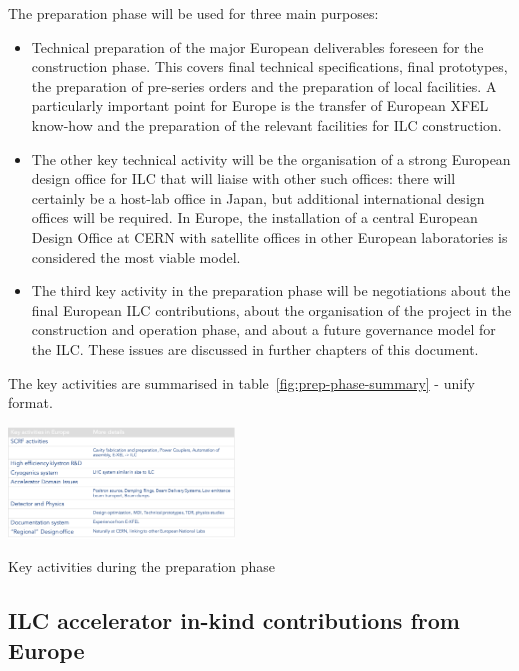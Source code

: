 \documentclass[%
 reprint,
 amsmath,amssymb,
 aps,
]{revtex4-1}
\begin{document}
The preparation phase will be used for three main purposes:

\begin{itemize}
\item 
Technical preparation of the major European deliverables foreseen for the construction phase. This covers final technical specifications, final prototypes, the preparation of pre-series orders and the preparation of local facilities. A particularly important point for Europe is the transfer of European XFEL know-how and the preparation of the relevant facilities for ILC construction.
\item
The other key technical activity will be the organisation of a strong European design office for ILC that will liaise with other such offices: there will certainly be a host-lab office in Japan, but additional international design offices will be required. In Europe, the installation of a central European Design Office at CERN with satellite offices in other European laboratories is considered the most viable model.
\item 
The third key activity in the preparation phase will be negotiations about the final European ILC contributions, about the organisation of the project in the construction and operation phase, and about a future governance model for the ILC. These issues are discussed in further chapters of this document.
\end{itemize}

The key activities are summarised in table~\ref{fig:prep-phase-summary} - unify format.


\begin{table}[htbp]
\includegraphics[width=0.45\textwidth]{figures/prep-phase-summary.pdf}
\caption{\label{fig:prep-phase-summary} Key activities during the preparation phase}
\end{table}


\subsection{ILC accelerator in-kind contributions from Europe ~\label{sec:constrphase:accelerator}}
\end{document}
